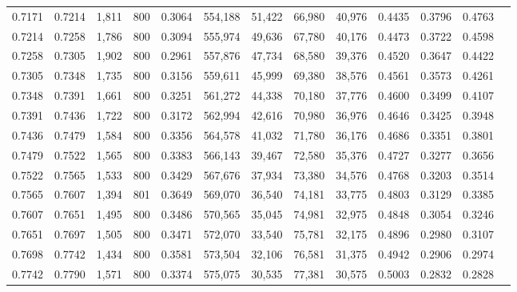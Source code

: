 \begin{tabular}{rrrrrrrrrrrrr}
0.7171 & 0.7214 &  1,811 &   800 &                                     0.3064 & 554,188 &  51,422 &  66,980 &  40,976 & 0.4435 & 0.3796 & 0.4763 \\
0.7214 & 0.7258 &  1,786 &   800 &                                     0.3094 & 555,974 &  49,636 &  67,780 &  40,176 & 0.4473 & 0.3722 & 0.4598 \\
0.7258 & 0.7305 &  1,902 &   800 &                                     0.2961 & 557,876 &  47,734 &  68,580 &  39,376 & 0.4520 & 0.3647 & 0.4422 \\
0.7305 & 0.7348 &  1,735 &   800 &                                     0.3156 & 559,611 &  45,999 &  69,380 &  38,576 & 0.4561 & 0.3573 & 0.4261 \\
0.7348 & 0.7391 &  1,661 &   800 &                                     0.3251 & 561,272 &  44,338 &  70,180 &  37,776 & 0.4600 & 0.3499 & 0.4107 \\
0.7391 & 0.7436 &  1,722 &   800 &                                     0.3172 & 562,994 &  42,616 &  70,980 &  36,976 & 0.4646 & 0.3425 & 0.3948 \\
0.7436 & 0.7479 &  1,584 &   800 &                                     0.3356 & 564,578 &  41,032 &  71,780 &  36,176 & 0.4686 & 0.3351 & 0.3801 \\
0.7479 & 0.7522 &  1,565 &   800 &                                     0.3383 & 566,143 &  39,467 &  72,580 &  35,376 & 0.4727 & 0.3277 & 0.3656 \\
0.7522 & 0.7565 &  1,533 &   800 &                                     0.3429 & 567,676 &  37,934 &  73,380 &  34,576 & 0.4768 & 0.3203 & 0.3514 \\
0.7565 & 0.7607 &  1,394 &   801 &                                     0.3649 & 569,070 &  36,540 &  74,181 &  33,775 & 0.4803 & 0.3129 & 0.3385 \\
0.7607 & 0.7651 &  1,495 &   800 &                                     0.3486 & 570,565 &  35,045 &  74,981 &  32,975 & 0.4848 & 0.3054 & 0.3246 \\
0.7651 & 0.7697 &  1,505 &   800 &                                     0.3471 & 572,070 &  33,540 &  75,781 &  32,175 & 0.4896 & 0.2980 & 0.3107 \\
0.7698 & 0.7742 &  1,434 &   800 &                                     0.3581 & 573,504 &  32,106 &  76,581 &  31,375 & 0.4942 & 0.2906 & 0.2974 \\
0.7742 & 0.7790 &  1,571 &   800 &                                     0.3374 & 575,075 &  30,535 &  77,381 &  30,575 & 0.5003 & 0.2832 & 0.2828 \\

\end{tabular}
